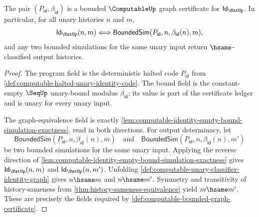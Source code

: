 \begin{theorem}
\label{thm:computable-identity-bounded-graph-certificate}
The pair $(P_{\mathsf{id}},\beta_{\mathsf{id}})$ is a bounded $\ComputableUp$ graph certificate for $\mathsf{Id}_{\NatUp}$. In particular, for all unary histories $n$ and $m$,
$$
  \mathsf{Id}_{\NatUp}(n,m)
  \Longleftrightarrow
  \mathsf{BoundedSim}(P_{\mathsf{id}},n,\beta_{\mathsf{id}}(n),m),
$$
and any two bounded simulations for the same unary input return $\hsame$-classified output histories.
\end{theorem}
\begin{proof}
The program field is the deterministic halted code $P_{\mathsf{id}}$ from \autoref{def:computable-halted-unary-identity-code}. The bound field is the constant-empty $\SeqUp$ unary-bound modulus $\beta_{\mathsf{id}}$; its value is part of the certificate ledger and is unary for every unary input.

The graph-equivalence field is exactly \autoref{lem:computable-identity-empty-bound-simulation-exactness}, read in both directions. For output determinacy, let
$$
  \mathsf{BoundedSim}(P_{\mathsf{id}},n,\beta_{\mathsf{id}}(n),m)
  \quad\text{and}\quad
  \mathsf{BoundedSim}(P_{\mathsf{id}},n,\beta_{\mathsf{id}}(n),m')
$$
be two bounded simulations for the same unary input. Applying the reverse direction of \autoref{lem:computable-identity-empty-bound-simulation-exactness} gives $\mathsf{Id}_{\NatUp}(n,m)$ and $\mathsf{Id}_{\NatUp}(n,m')$. Unfolding \autoref{def:computable-unary-classifier-identity-graph} gives $n\hsame m$ and $n\hsame m'$. Symmetry and transitivity of history-sameness from \autoref{thm:history-sameness-equivalence} yield $m\hsame m'$. These are precisely the fields required by \autoref{def:computable-bounded-graph-certificate}.
\end{proof}


